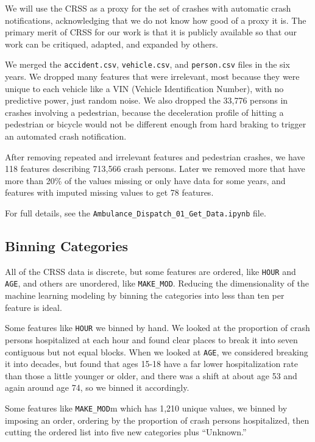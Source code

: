 We will use the CRSS as a proxy for the set of crashes with automatic crash notifications, acknowledging that we do not know how good of a proxy it is.  The primary merit of CRSS for our work is that it is publicly available so that our work can be critiqued, adapted, and expanded by others.  

We merged the \verb|accident.csv|, \verb|vehicle.csv|, and \verb|person.csv| files in the six years.  We dropped many features that were irrelevant, most because they were unique to each vehicle like a VIN (Vehicle Identification Number), with no predictive power, just random noise.  We also dropped the 33,776 persons in crashes involving a pedestrian, because the deceleration profile of hitting a pedestrian or bicycle would not be different enough from hard braking to trigger an automated crash notification.  

After removing repeated and irrelevant features and pedestrian crashes, we have 118 features describing 713,566 crash persons.  Later we removed more that have more than 20\% of the values missing or only have data for some years, and features with imputed missing values to get 78 features.

For full details, see the \verb|Ambulance_Dispatch_01_Get_Data.ipynb| file.  

\subsection{Binning Categories}

All of the CRSS data is discrete, but some features are ordered, like \verb|HOUR| and \verb|AGE|, and others are unordered, like \verb|MAKE_MOD|.  Reducing the dimensionality of the machine learning modeling by binning the categories into less than ten per feature is ideal.  

Some features like \verb|HOUR| we binned by hand.  We looked at the proportion of crash persons hospitalized at each hour and found clear places to break it into seven contiguous but not equal blocks.  When we looked at \verb|AGE|, we considered breaking it into decades, but found that ages 15-18 have a far lower hospitalization rate than those a little younger or older, and there was a shift at about age 53 and again around age 74, so we binned it accordingly.  

Some features like \verb|MAKE_MOD|m which has 1,210 unique values, we binned by imposing an order, ordering by the proportion of crash persons hospitalized, then cutting the ordered list into five new categories plus ``Unknown.''  



